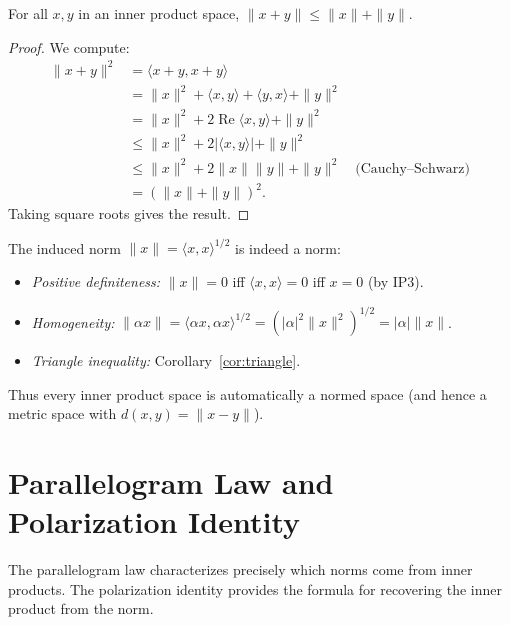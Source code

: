 \documentclass[11pt,a4paper]{article}
\begin{document}
\begin{corollary}
\label{cor:triangle}
For all $x, y$ in an inner product space,
$\|x + y\| \le \|x\| + \|y\|$.
\end{corollary}

\begin{proof}
We compute:
\begin{align*}
\|x + y\|^2
&= \langle x + y, x + y \rangle \\
&= \|x\|^2 + \langle x, y \rangle + \langle y, x \rangle + \|y\|^2 \\
&= \|x\|^2 + 2\operatorname{Re}\langle x, y \rangle + \|y\|^2 \\
&\le \|x\|^2 + 2|\langle x, y \rangle| + \|y\|^2 \\
&\le \|x\|^2 + 2\|x\|\|y\| + \|y\|^2 \quad \text{(Cauchy--Schwarz)} \\
&= (\|x\| + \|y\|)^2.
\end{align*}
Taking square roots gives the result.
\end{proof}

\begin{remark}
\label{rem:norm_verification}
The induced norm $\|x\| = \langle x, x \rangle^{1/2}$ is indeed a norm:
\begin{itemize}[nosep]
    \item \emph{Positive definiteness:} $\|x\| = 0$ iff
          $\langle x, x \rangle = 0$ iff $x = 0$ (by IP3).
    \item \emph{Homogeneity:}
          $\|\alpha x\| = \langle \alpha x, \alpha x \rangle^{1/2}
          = (|\alpha|^2 \|x\|^2)^{1/2} = |\alpha| \|x\|$.
    \item \emph{Triangle inequality:} Corollary~\ref{cor:triangle}.
\end{itemize}
Thus every inner product space is automatically a normed space (and hence a
metric space with $d(x,y) = \|x - y\|$).
\end{remark}


\section{Parallelogram Law and Polarization Identity}
\label{sec:parallelogram}

The parallelogram law characterizes precisely which norms come from inner
products. The polarization identity provides the formula for recovering the
inner product from the norm.
\end{document}
